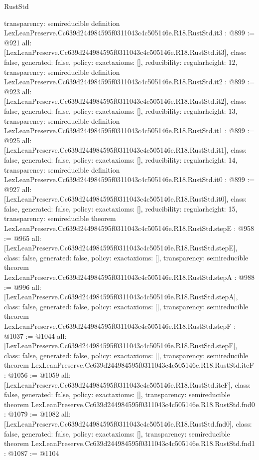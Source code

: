 \begin{lexlean}{RustStd}
\begin{coremodule}
{  transparency: semireducible
}
definition LexLeanPreserve.Cc639d244984595f0311043c4c505146e.R18.RustStd.it3 : @899 := @921 {
  all: [LexLeanPreserve.Cc639d244984595f0311043c4c505146e.R18.RustStd.it3],
  class: false,
  generated: false,
  policy: exact{axioms: []},
  reducibility: regular{height: 12},
  transparency: semireducible
}
definition LexLeanPreserve.Cc639d244984595f0311043c4c505146e.R18.RustStd.it2 : @899 := @923 {
  all: [LexLeanPreserve.Cc639d244984595f0311043c4c505146e.R18.RustStd.it2],
  class: false,
  generated: false,
  policy: exact{axioms: []},
  reducibility: regular{height: 13},
  transparency: semireducible
}
definition LexLeanPreserve.Cc639d244984595f0311043c4c505146e.R18.RustStd.it1 : @899 := @925 {
  all: [LexLeanPreserve.Cc639d244984595f0311043c4c505146e.R18.RustStd.it1],
  class: false,
  generated: false,
  policy: exact{axioms: []},
  reducibility: regular{height: 14},
  transparency: semireducible
}
definition LexLeanPreserve.Cc639d244984595f0311043c4c505146e.R18.RustStd.it0 : @899 := @927 {
  all: [LexLeanPreserve.Cc639d244984595f0311043c4c505146e.R18.RustStd.it0],
  class: false,
  generated: false,
  policy: exact{axioms: []},
  reducibility: regular{height: 15},
  transparency: semireducible
}
theorem LexLeanPreserve.Cc639d244984595f0311043c4c505146e.R18.RustStd.stepE : @958 := @965 {
  all: [LexLeanPreserve.Cc639d244984595f0311043c4c505146e.R18.RustStd.stepE],
  class: false,
  generated: false,
  policy: exact{axioms: []},
  transparency: semireducible
}
theorem LexLeanPreserve.Cc639d244984595f0311043c4c505146e.R18.RustStd.stepA : @988 := @996 {
  all: [LexLeanPreserve.Cc639d244984595f0311043c4c505146e.R18.RustStd.stepA],
  class: false,
  generated: false,
  policy: exact{axioms: []},
  transparency: semireducible
}
theorem LexLeanPreserve.Cc639d244984595f0311043c4c505146e.R18.RustStd.stepF : @1037 := @1044 {
  all: [LexLeanPreserve.Cc639d244984595f0311043c4c505146e.R18.RustStd.stepF],
  class: false,
  generated: false,
  policy: exact{axioms: []},
  transparency: semireducible
}
theorem LexLeanPreserve.Cc639d244984595f0311043c4c505146e.R18.RustStd.iteF : @1056 := @1059 {
  all: [LexLeanPreserve.Cc639d244984595f0311043c4c505146e.R18.RustStd.iteF],
  class: false,
  generated: false,
  policy: exact{axioms: []},
  transparency: semireducible
}
theorem LexLeanPreserve.Cc639d244984595f0311043c4c505146e.R18.RustStd.fnd0 : @1079 := @1082 {
  all: [LexLeanPreserve.Cc639d244984595f0311043c4c505146e.R18.RustStd.fnd0],
  class: false,
  generated: false,
  policy: exact{axioms: []},
  transparency: semireducible
}
theorem LexLeanPreserve.Cc639d244984595f0311043c4c505146e.R18.RustStd.fnd1 : @1087 := @1104 {
}
\end{coremodule}
\end{lexlean}

